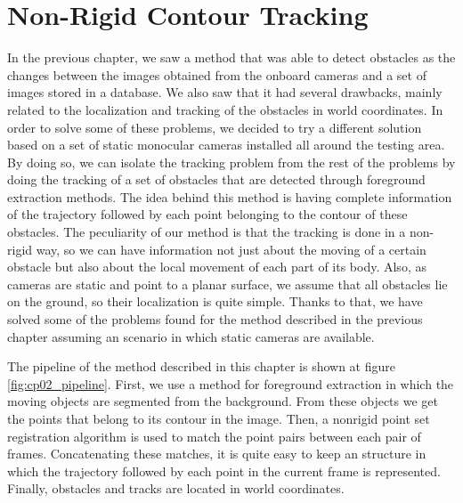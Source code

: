 
\graphicspath{{./images/chapter02/bmps/}{./images/chapter02/vects/}{./images/chapter02/}}

\chapter{Non-Rigid Contour Tracking}\label{ch:chapter02}

In the previous chapter, we saw a method that was able to detect obstacles as the changes between the images obtained from the onboard cameras and a set of images stored in a database. We also saw that it had several drawbacks, mainly related to the localization and tracking of the obstacles in world coordinates. In order to solve some of these problems, we decided to try a different solution based on a set of static monocular cameras installed all around the testing area. By doing so, we can isolate the tracking problem from the rest of the problems by doing the tracking of a set of obstacles that are detected through foreground extraction methods.
The idea behind this method is having complete information of the trajectory followed by each point belonging to the contour of these obstacles. The peculiarity of our method is that the tracking is done in a non-rigid way, so we can have information not just about the moving of a certain obstacle but also about the local movement of each part of its body.
Also, as cameras are static and point to a planar surface, we assume that all obstacles lie on the ground, so their localization is quite simple. Thanks to that, we have solved some of the problems found for the method described in the previous chapter assuming an scenario in which static cameras are available. 

The pipeline of the method described in this chapter is shown at figure \ref{fig:cp02_pipeline}. First, we use a method for foreground extraction in which the moving objects are segmented from the background. From these objects we get the points that belong to its contour in the image. Then, a nonrigid point set registration algorithm is used to match the point pairs between each pair of frames. Concatenating these matches, it is quite easy to keep an structure in which the trajectory followed by each point in the current frame is represented. Finally, obstacles and tracks are located in world coordinates.

